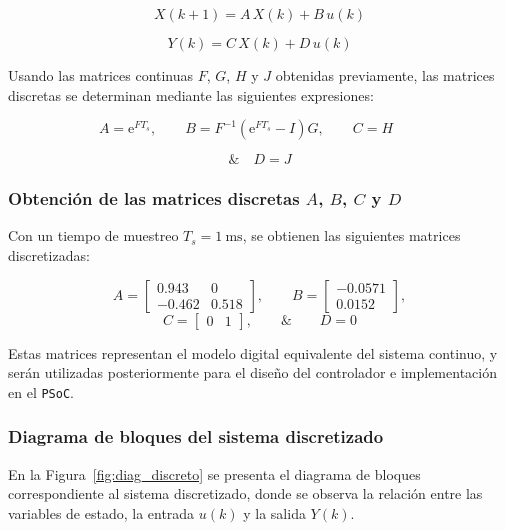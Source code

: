 \begin{equation}
	X(k+1) = A\,X(k) + B\,u(k)
	\label{eq:3}
\end{equation}

\begin{equation}
	Y(k) = C\,X(k) + D\,u(k)
	\label{eq:4}
\end{equation}

Usando las matrices continuas $F$, $G$, $H$ y $J$ obtenidas previamente, las matrices discretas se determinan mediante las siguientes expresiones:

\[
A = \mathrm{e}^{F T_s}, \qquad 
B = F^{-1}\!\left(\mathrm{e}^{F T_s} - I\right)G, \qquad 
C = H \qquad 
\]

\[
 \& \quad D = J
\]
\subsubsection{Obtención de las matrices discretas $A$, $B$, $C$ y $D$}

Con un tiempo de muestreo $T_s = 1~\text{ms}$, se obtienen las siguientes matrices discretizadas:

\[
A =
\begin{bmatrix}
	0.943 & 0 \\[4pt]
	-0.462 & 0.518
\end{bmatrix}, \qquad
B =
\begin{bmatrix}
	-0.0571 \\[4pt]
	0.0152
\end{bmatrix}, 
\]
\begin{equation}
	C =
	\begin{bmatrix}
		0 & 1
	\end{bmatrix}, \qquad \& \qquad
	D = 0
	\label{eq:d}
\end{equation}

Estas matrices representan el modelo digital equivalente del sistema continuo, y serán utilizadas posteriormente para el diseño del controlador e implementación en el \texttt{PSoC}.

\subsubsection{Diagrama de bloques del sistema discretizado}

En la Figura~\ref{fig:diag_discreto} se presenta el diagrama de bloques correspondiente al sistema discretizado, donde se observa la relación entre las variables de estado, la entrada $u(k)$ y la salida $Y(k)$.



